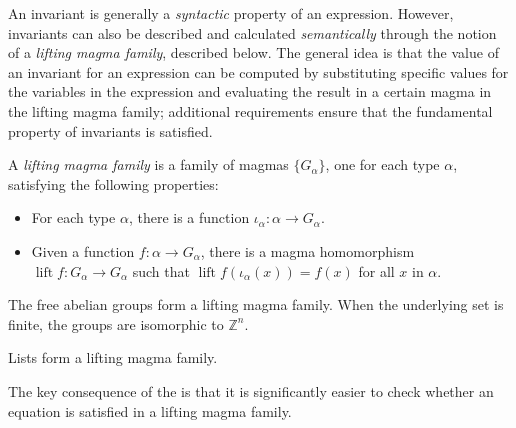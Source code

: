 An invariant is generally a \emph{syntactic} property of an expression. However, invariants can also be described and calculated \emph{semantically} through the notion of a \emph{lifting magma family}, described below. The general idea is that the value of an invariant for an expression can be computed by substituting specific values for the variables in the expression and evaluating the result in a certain magma in the lifting magma family; additional requirements ensure that the fundamental property of invariants is satisfied.

\begin{definition}\leanok\label{lifting-magma-family}
	A \emph{lifting magma family} is a family of magmas $\{G_\alpha\}$, one for each type $\alpha$, satisfying the following properties:
	\begin{itemize}
		\item For each type $\alpha$, there is a function $\iota_\alpha : \alpha \to G_\alpha$.
		\item Given a function $f : \alpha \to G_\alpha$, there is a magma homomorphism $\operatorname{lift}{f} : G_\alpha \to G_\alpha$ such that $\operatorname{lift}{f}(\iota_\alpha(x)) = f(x)$ for all $x$ in $\alpha$.
	\end{itemize}
\end{definition}

\begin{example}
	The free abelian groups form a lifting magma family. When the underlying set is finite, the groups are isomorphic to $\mathbb{Z}^n$.
\end{example}

\begin{example}
	Lists form a lifting magma family.
\end{example}

The key consequence of the  is that it is significantly easier to check whether an equation is satisfied in a lifting magma family.

